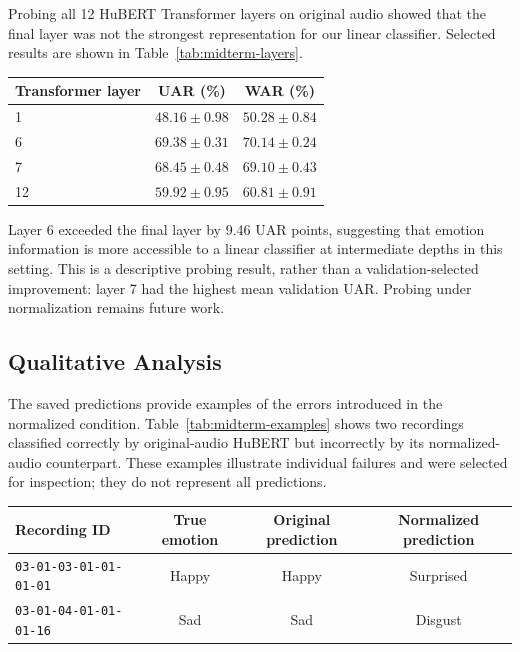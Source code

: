 \documentclass[11pt, letterpaper]{article}
\begin{document}
Probing all 12 HuBERT Transformer layers on original audio showed that the final layer was not the strongest representation for our linear classifier. Selected results are shown in Table~\ref{tab:midterm-layers}.

\begin{center}
\begin{tabular}{lcc}
\toprule
\textbf{Transformer layer} & \textbf{UAR (\%)} & \textbf{WAR (\%)} \\
\midrule
1 & $48.16 \pm 0.98$ & $50.28 \pm 0.84$ \\
6 & $69.38 \pm 0.31$ & $70.14 \pm 0.24$ \\
7 & $68.45 \pm 0.48$ & $69.10 \pm 0.43$ \\
12 & $59.92 \pm 0.95$ & $60.81 \pm 0.91$ \\
\bottomrule
\end{tabular}
\label{tab:midterm-layers}
\end{center}

Layer 6 exceeded the final layer by 9.46 UAR points, suggesting that emotion information is more accessible to a linear classifier at intermediate depths in this setting. This is a descriptive probing result, rather than a validation-selected improvement: layer 7 had the highest mean validation UAR. Probing under normalization remains future work.

\subsection{Qualitative Analysis}

The saved predictions provide examples of the errors introduced in the normalized condition. Table~\ref{tab:midterm-examples} shows two recordings classified correctly by original-audio HuBERT but incorrectly by its normalized-audio counterpart. These examples illustrate individual failures and were selected for inspection; they do not represent all predictions.

\begin{center}
\small
\begin{tabular}{lccc}
\toprule
\textbf{Recording ID} & \textbf{True emotion} & \textbf{Original prediction} & \textbf{Normalized prediction} \\
\midrule
\texttt{03-01-03-01-01-01-01} & Happy & Happy & Surprised \\
\texttt{03-01-04-01-01-01-16} & Sad & Sad & Disgust \\
\bottomrule
\end{tabular}
\label{tab:midterm-examples}
\end{center}
\end{document}
